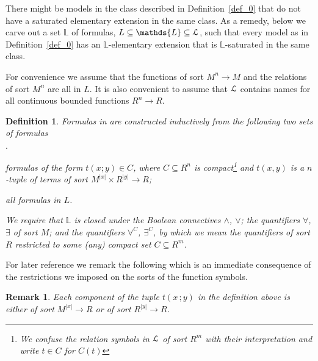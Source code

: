 \documentclass[12pt,letterpaper,oneside,reqno]{amsart}
\newcommand{\mylabel}[1]{{#1}\hfill}
\renewenvironment{itemize}
  {\begin{list}{$\cdot$}{%
   \setlength{\parskip}{0mm}
   \setlength{\topsep}{.2\baselineskip}
   \setlength{\rightmargin}{0mm}
   \setlength{\listparindent}{0mm}
   \setlength{\itemindent}{0mm}
   \setlength{\labelwidth}{3ex}
   \setlength{\itemsep}{.2\baselineskip}
   \setlength{\parsep}{.2\baselineskip}
   \setlength{\partopsep}{0mm}
   \setlength{\labelsep}{1ex}
   \setlength{\leftmargin}{\labelwidth+\labelsep}
   \let\makelabel\mylabel}}{%
   \end{list}}
\theoremstyle{plain}
\newtheorem{definition}[theorem]{Definition}
\newtheorem{remark}[theorem]{Remark}
\theoremstyle{remark}
\renewcommand*{\emph}[1]{%
   \smash{\tikz[baseline]\node[rectangle, fill=olive!25, rounded corners, inner xsep=0.5ex, inner ysep=0.2ex, anchor=base, minimum height = 2.7ex]{#1};}}
\begin{document}
There might be models in the class described in Definition~\ref{def_0} that do not have a saturated elementary extension in the same class.
As a remedy, below we carve out a set $\mathds{L}$ of formulas, $L\subseteq\mathds{L}\subseteq {\EuScript L}$, such that every model as in Definition~\ref{def_0} has an $\mathds{L}$-elementary extension that is $\mathds{L}$-saturated in the same class.

For convenience we assume that the functions of sort $M^n\to M$ and the relations of sort $M^n$ are all in $L$.
It is also convenient to assume that ${\EuScript L}$ contains names for all continuous bounded functions $R^n\to R$.

\begin{definition}\label{def_LL}
  Formulas in \emph{$\mathds{L}$\/} are constructed inductively from the following two sets of formulas
  \begin{itemize}
  \item[i.] formulas of the form $t(x;y)\in C$, where $C\subseteq R^n$ is compact\footnote{We confuse the relation symbols in ${\EuScript L}$ of sort $R^m$ with their interpretation and write $t\in C$ for $C(t)$} and $t(x,y)$ is a $n$-tuple of terms of sort $M^{|x|}\times R^{|y|}\to R$; 
  \item[ii.] all formulas in $L$.
  \end{itemize}
  We require that $\mathds{L}$ is closed under the Boolean connectives $\wedge$, $\vee$; the quantifiers $\forall$, $\exists$ of sort $M$; and the quantifiers $\forall^C$, $\exists^C$, by which we mean the quantifiers of sort $R$ restricted to some (any) compact set $C\subseteq R^m$.
\end{definition}

For later reference we remark the following which is an immediate consequence of the restrictions we imposed on the sorts of the function symbols.

\begin{remark}\label{rk_terms}
   Each component of the tuple $t(x\,;y)$ in the definition above is either of sort $M^{|x|}\to R$ or of sort $R^{|y|}\to R$.\hfill\qedsymbol
\end{remark}

\def\ceq#1#2#3{\parbox[t]{39ex}{$\displaystyle #1$}\parbox{5ex}{\hfil $#2$}{$\displaystyle #3$}}
\end{document}
